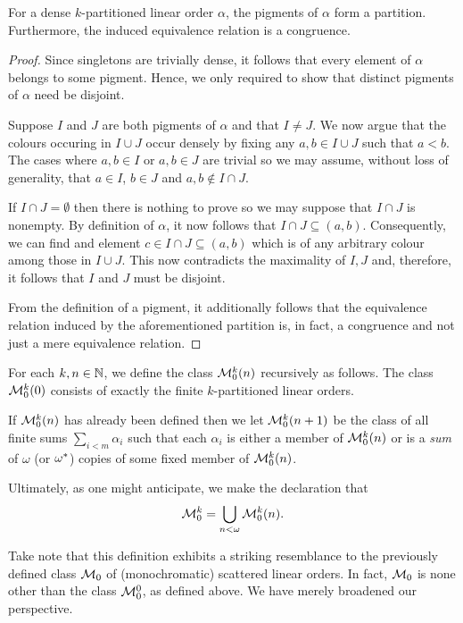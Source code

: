 \begin{prp}
	For a dense $k$-partitioned linear order $\alpha$, the pigments of $\alpha$ form a partition.  Furthermore, the induced equivalence relation is a congruence.
\end{prp}
\begin{proof}
	Since singletons are trivially dense, it follows that every element of $\alpha$ belongs to some pigment.  Hence, we only required to show that distinct pigments of $\alpha$ need be disjoint.

	Suppose $I$ and $J$ are both pigments of $\alpha$ and that $I\neq J$.  We now argue that the colours occuring in $I\cup J$ occur densely by fixing any $a,b\in I\cup J$ such that $a<b$.  The cases where $a,b\in I$ or $a,b\in J$ are trivial so we may assume, without loss of generality, that $a\in I$, $b\in J$ and $a,b\notin I\cap J$.

	If $I\cap J=\emptyset$ then there is nothing to prove so we may suppose that $I\cap J$ is nonempty.  By definition of $\alpha$, it now follows that $I\cap J\subseteq (a,b)$.  Consequently, we can find and element $c\in I\cap J\subseteq (a,b)$ which is of any arbitrary colour among those in $I\cup J$.  This now contradicts the maximality of $I,J$ and, therefore, it follows that $I$ and $J$ must be disjoint.

	From the definition of a pigment, it additionally follows that the equivalence relation induced by the aforementioned partition is, in fact, a congruence and not just a mere equivalence relation.
\end{proof}

\begin{dfn}
	For each $k,n\in\mathbb{N}$, we define the class $\mathcal{M}_0^k(n)$ recursively as follows.  The class $\mathcal{M}_0^k(0)$ consists of exactly the finite $k$-partitioned linear orders.

	If $\mathcal{M}_0^k(n)$ has already been defined then we let $\mathcal{M}_0^k(n+1)$ be the class of all finite sums $\sum_{i<m}\alpha_i$ such that each $\alpha_i$ is either a member of $\mathcal{M}_0^k(n)$ or is a \textit{sum} of $\omega$ (or ${\omega}^\ast$) copies of some fixed member of $\mathcal{M}_0^k(n)$.

	Ultimately, as one might anticipate, we make the declaration that
	\begin{equation}
		\mathcal{M}_0^k=\bigcup_{n<\omega}\mathcal{M}_0^k(n).
	\end{equation}
\end{dfn}

Take note that this definition exhibits a striking resemblance to the previously defined class $\mathcal{M}_0$ of (monochromatic) scattered linear orders.  In fact, $\mathcal{M}_0$ is none other than the class $\mathcal{M}_0^0$, as defined above.  We have merely broadened our perspective.

